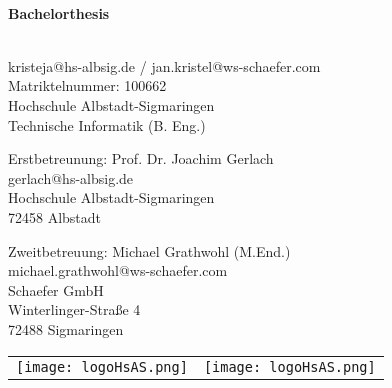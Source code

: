 \documentclass[
	ngerman,
	a4paper,
	twoside
]{scrbook}
\begin{document}
\begin{titlepage}
	\begin{center}
	\vspace*{1cm}
		{\Huge\bfseries\doctitle\\[1em]\large Bachelorthesis}
	\vspace{1cm}
		\date{\today} %
		
		\docauthor\\
		kristeja@hs-albsig.de / jan.kristel@ws-schaefer.com\\
		Matriktelnummer: 100662\\
		Hochschule Albstadt-Sigmaringen\\
		Technische Informatik (B. Eng.)\\
		
\vspace{8mm}

		Erstbetreunung: Prof. Dr. Joachim Gerlach\\
		gerlach@hs-albsig.de\\
		Hochschule Albstadt-Sigmaringen\\
		72458 Albstadt
		
\vspace{8mm}

		Zweitbetreuung: Michael Grathwohl (M.End.)\\
		michael.grathwohl@ws-schaefer.com\\
		Schaefer GmbH\\
		Winterlinger-Straße 4\\
		72488 Sigmaringen
	\end{center}

\vspace{8mm}


	\begin{tabular}{ ll }
		\texttt{[image: logoHsAS.png]}
		&
   		\texttt{[image: logoHsAS.png]}
	\end{tabular}

	

\end{titlepage}
\end{document}

